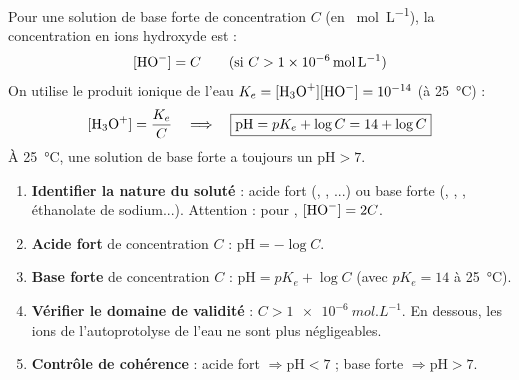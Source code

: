 \documentclass[11pt]{article}
\begin{document}
\begin{propriete}
Pour une solution de base forte de concentration $C$ (en \SI{}{mol.L^{-1}}), la concentration en ions hydroxyde est :
\[ [\ce{HO-}] = C \qquad (\text{si } C > \SI{1e-6}{mol.L^{-1}}) \]
On utilise le produit ionique de l'eau $K_e = [\ce{H3O+}][\ce{HO-}] = 10^{-14}$ (à \SI{25}{\celsius}) :
\[ [\ce{H3O+}] = \frac{K_e}{C} \quad\Longrightarrow\quad \boxed{\text{pH} = pK_e + \log C = 14 + \log C} \]
À \SI{25}{\celsius}, une solution de base forte a toujours un $\text{pH} > 7$.
\end{propriete}

\begin{methode}
\begin{enumerate}
\item \textbf{Identifier la nature du soluté} : acide fort (, , ...) ou base forte (, , , éthanolate de sodium...). Attention : pour , $[\ce{HO-}] = 2C$.
\item \textbf{Acide fort} de concentration $C$ : $\text{pH} = -\log C$.
\item \textbf{Base forte} de concentration $C$ : $\text{pH} = pK_e + \log C$ (avec $pK_e = 14$ à \SI{25}{\celsius}).
\item \textbf{Vérifier le domaine de validité} : $C > \SI{1e-6}{mol.L^{-1}}$. En dessous, les ions de l'autoprotolyse de l'eau ne sont plus négligeables.
\item \textbf{Contrôle de cohérence} : acide fort $\Rightarrow \text{pH} < 7$ ; base forte $\Rightarrow \text{pH} > 7$.
\end{enumerate}
\end{methode}
\end{document}
